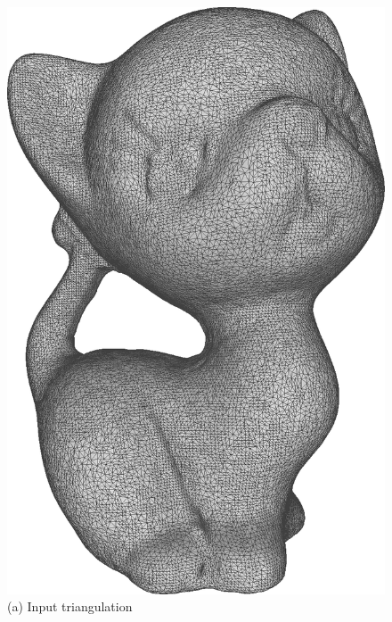 \begin{figure}
     \centering
    \begin{minipage}{0.16\textwidth}
     \centering
   \includegraphics[width=\textwidth,height=1.33\textwidth]{quadriflow/result/area00.png}\\
   (a) Input triangulation
   \end{minipage}
    \begin{minipage}{0.16\textwidth}
     \centering

\end{minipage}
\end{figure}
